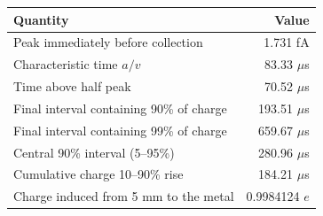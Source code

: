 \begin{tabular}{lr}
\toprule
Quantity & Value \\
\midrule
Peak immediately before collection & 1.731 fA \\
Characteristic time $a/v$ & 83.33 $\mu$s \\
Time above half peak & 70.52 $\mu$s \\
Final interval containing 90\% of charge & 193.51 $\mu$s \\
Final interval containing 99\% of charge & 659.67 $\mu$s \\
Central 90\% interval (5--95\%) & 280.96 $\mu$s \\
Cumulative charge 10--90\% rise & 184.21 $\mu$s \\
Charge induced from 5 mm to the metal & 0.9984124 $e$ \\
\bottomrule
\end{tabular}
